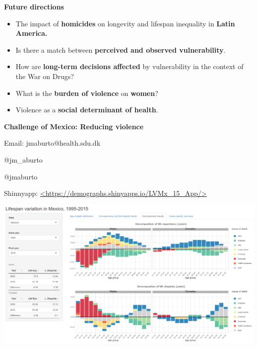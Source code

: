 \documentclass[xcolor={dvipsnames}]{beamer}
\begin{document}
\begin{frame}
\Large{
\textbf{Future directions} \pause

		\begin{itemize}
		
		\item The impact of \textbf{homicides} on longevity and lifespan inequality in \textbf{Latin America.} \pause
		
		\item Is there a match between \textbf{perceived and observed vulnerability}.\pause
		
		\item How are \textbf{long-term decisions affected} by vulnerability in the context of the War on Drugs?\pause
		
		\item What is the \textbf{burden of violence} on \textbf{women}?\pause
		
		\item Violence as a \textbf{social determinant of health}.\pause
							
		\end{itemize}

}
\end{frame}




\begin{frame}
 \begin{center}
	\begin{center}
	 \textbf{Challenge of Mexico: Reducing violence}
	\end{center}

	\bigskip

Email: jmaburto@health.sdu.dk 

\faTwitter \quad  @jm\_aburto 

\faGithub \quad @jmaburto 

Shinnyapp: \url{<https://demographs.shinyapps.io/LVMx_15_App/>}


\includegraphics[scale=0.23]{Figures/Shinnyapp_fig} \\   

 

\end{center}
 
 

\end{frame}
\end{document}

